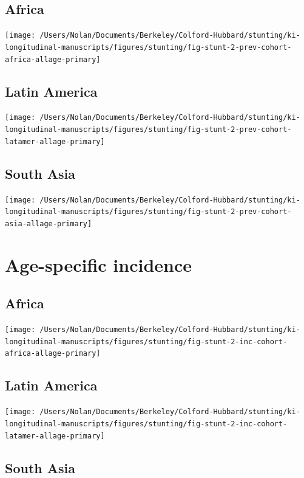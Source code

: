 \documentclass[9pt,]{book}
\begin{document}
\subsection{Africa}\label{africa-1}

\texttt{[image: /Users/Nolan/Documents/Berkeley/Colford-Hubbard/stunting/ki-longitudinal-manuscripts/figures/stunting/fig-stunt-2-prev-cohort-africa-allage-primary]}

\subsection{Latin America}\label{latin-america-1}

\texttt{[image: /Users/Nolan/Documents/Berkeley/Colford-Hubbard/stunting/ki-longitudinal-manuscripts/figures/stunting/fig-stunt-2-prev-cohort-latamer-allage-primary]}

\subsection{South Asia}\label{south-asia-1}

\texttt{[image: /Users/Nolan/Documents/Berkeley/Colford-Hubbard/stunting/ki-longitudinal-manuscripts/figures/stunting/fig-stunt-2-prev-cohort-asia-allage-primary]}

\section{Age-specific incidence}\label{age-specific-incidence}

\subsection{Africa}\label{africa-2}

\texttt{[image: /Users/Nolan/Documents/Berkeley/Colford-Hubbard/stunting/ki-longitudinal-manuscripts/figures/stunting/fig-stunt-2-inc-cohort-africa-allage-primary]}

\subsection{Latin America}\label{latin-america-2}

\texttt{[image: /Users/Nolan/Documents/Berkeley/Colford-Hubbard/stunting/ki-longitudinal-manuscripts/figures/stunting/fig-stunt-2-inc-cohort-latamer-allage-primary]}

\subsection{South Asia}\label{south-asia-2}
\end{document}
